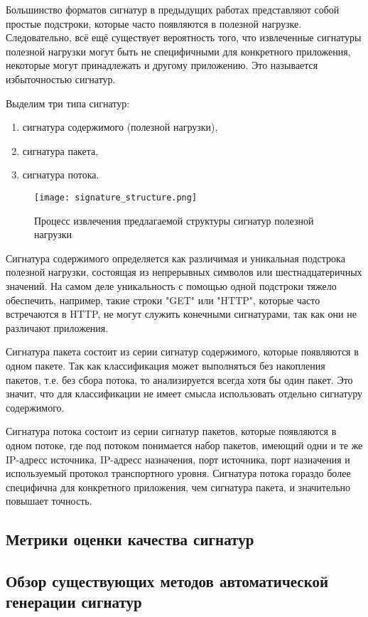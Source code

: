 Большинство форматов сигнатур в предыдущих работах представляют собой простые подстроки, которые часто появляются в полезной нагрузке.
Следовательно, всё ещё существует вероятность того, что извлеченные сигнатуры полезной нагрузки могут быть не специфичными для конкретного приложения,
некоторые могут принадлежать и другому приложению. Это называется избыточностью сигнатур.

Выделим три типа сигнатур:

\begin{enumerate}
    \item сигнатура содержимого (полезной нагрузки),
    \item сигнатура пакета,
    \item сигнатура потока.
\end{enumerate}

\begin{figure}[H]
    \begin{center}
        \texttt{[image: signature\_structure.png]}
        \caption{Процесс извлечения предлагаемой структуры сигнатур полезной нагрузки}
    \end{center}
\end{figure}

Сигнатура содержимого определяется как различимая и уникальная подстрока полезной нагрузки, состоящая из непрерывных символов или шестнадцатеричных значений.
На самом деле уникальность с помощью одной подстроки тяжело обеспечить, например, такие строки "GET" или "HTTP", которые часто встречаются в HTTP,
не могут служить конечными сигнатурами, так как они не различают приложения.

Сигнатура пакета состоит из серии сигнатур содержимого, которые появляются в одном пакете.
Так как классификация может выполняться без накопления пакетов, т.е. без сбора потока, то анализируется всегда хотя бы один пакет.
Это значит, что для классификации не имеет смысла использовать отдельно сигнатуру содержимого.

Сигнатура потока состоит из серии сигнатур пакетов, которые появляются в одном потоке, где под потоком понимается набор пакетов, имеющий одни и те же
IP-адресс источника, IP-адресс назначения, порт источника, порт назначения и используемый протокол транспортного уровня.
Сигнатура потока гораздо более специфична для конкретного приложения, чем сигнатура пакета, и значительно повышает точность.

\subsection{Метрики оценки качества сигнатур}

\subsection{Обзор существующих методов автоматической генерации сигнатур}

\newpage
